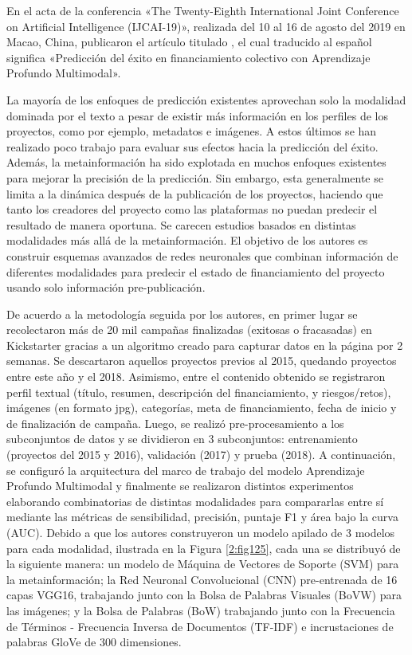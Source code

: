 \newpage
En el acta de la conferencia «The Twenty-Eighth International Joint Conference on Artificial Intelligence (IJCAI-19)», realizada del 10 al 16 de agosto del 2019 en Macao, China, \cite{pr_cheng2019deeplearning} publicaron el artículo titulado , el cual traducido al español significa «Predicción del éxito en financiamiento colectivo con Aprendizaje Profundo Multimodal».

La mayoría de los enfoques de predicción existentes aprovechan solo la modalidad dominada por el texto a pesar de existir más información en los perfiles de los proyectos, como por ejemplo, metadatos e imágenes. A estos últimos se han realizado poco trabajo para evaluar sus efectos hacia la predicción del éxito. Además, la metainformación ha sido explotada en muchos enfoques existentes para mejorar la precisión de la predicción. Sin embargo, esta generalmente se limita a la dinámica después de la publicación de los proyectos, haciendo que tanto los creadores del proyecto como las plataformas no puedan predecir el resultado de manera oportuna. Se carecen estudios basados en distintas modalidades más allá de la metainformación. El objetivo de los autores es construir esquemas avanzados de redes neuronales que combinan información de diferentes modalidades para predecir el estado de financiamiento del proyecto usando solo información pre-publicación.

De acuerdo a la metodología seguida por los autores, en primer lugar se recolectaron más de 20 mil campañas finalizadas (exitosas o fracasadas) en Kickstarter gracias a un algoritmo creado para capturar datos en la página por 2 semanas. Se descartaron aquellos proyectos previos al 2015, quedando proyectos entre este año y el 2018. Asimismo, entre el contenido obtenido se registraron perfil textual (título, resumen, descripción del financiamiento, y riesgos/retos), imágenes (en formato jpg), categorías, meta de financiamiento, fecha de inicio y de finalización de campaña. Luego, se realizó pre-procesamiento a los subconjuntos de datos y se dividieron en 3 subconjuntos: entrenamiento (proyectos del 2015 y 2016), validación (2017) y prueba (2018). A continuación, se configuró la arquitectura del marco de trabajo del modelo Aprendizaje Profundo Multimodal y finalmente se realizaron distintos experimentos elaborando combinatorias de distintas modalidades para compararlas entre sí mediante las métricas de sensibilidad, precisión, puntaje F1 y área bajo la curva (AUC). Debido a que los autores construyeron un modelo apilado de 3 modelos para cada modalidad, ilustrada en la Figura \ref{2:fig125}, cada una se distribuyó de la siguiente manera: un modelo de Máquina de Vectores de Soporte (SVM) para la metainformación; la Red Neuronal Convolucional (CNN) pre-entrenada de 16 capas VGG16, trabajando junto con la Bolsa de Palabras Visuales (BoVW) para las imágenes; y la Bolsa de Palabras (BoW) trabajando junto con la Frecuencia de Términos - Frecuencia Inversa de Documentos (TF-IDF) e incrustaciones de palabras GloVe de 300 dimensiones.

